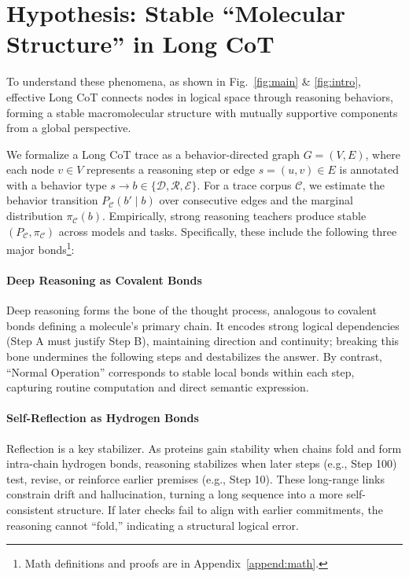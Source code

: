 \section{Hypothesis: Stable ``Molecular Structure'' in Long CoT}

To understand these phenomena, as shown in Fig.~\ref{fig:main} \& \ref{fig:intro}, effective Long CoT connects nodes in logical space through reasoning behaviors, forming a stable macromolecular structure with mutually supportive components from a global perspective.

We formalize a Long CoT trace as a behavior-directed graph \(G = (V, E)\), where each node \(v \in V\) represents a reasoning step or edge \(s = (u, v) \in E\) is annotated with a behavior type \(s\rightarrow b \in \{\mathcal{D}, \mathcal{R}, \mathcal{E}\}\). For a trace corpus \(\mathcal{C}\), we estimate the behavior transition \(P_{\mathcal{C}}(b' \mid b)\) over consecutive edges and the marginal distribution \(\pi_{\mathcal{C}}(b)\).
Empirically, strong reasoning teachers produce stable \((P_{\mathcal{C}}, \pi_{\mathcal{C}})\) across models and tasks.
Specifically, these include the following three major bonds\footnote{Math definitions and proofs are in Appendix~\ref{append:math}.}:\vspace{-8pt}








\paragraph{\textbf{Deep Reasoning as Covalent Bonds}}
Deep reasoning forms the bone of the thought process, analogous to covalent bonds defining a molecule's primary chain. It encodes strong logical dependencies (Step A must justify Step B), maintaining direction and continuity; breaking this bone undermines the following steps and destabilizes the answer. By contrast, ``Normal Operation'' corresponds to stable local bonds within each step, capturing routine computation and direct semantic expression.\vspace{-8pt}

\paragraph{\textbf{Self-Reflection as Hydrogen Bonds}}
Reflection is a key stabilizer. As proteins gain stability when chains fold and form intra-chain hydrogen bonds, reasoning stabilizes when later steps (e.g., Step 100) test, revise, or reinforce earlier premises (e.g., Step 10). These long-range links constrain drift and hallucination, turning a long sequence into a more self-consistent structure. If later checks fail to align with earlier commitments, the reasoning cannot ``fold,'' indicating a structural logical error.


